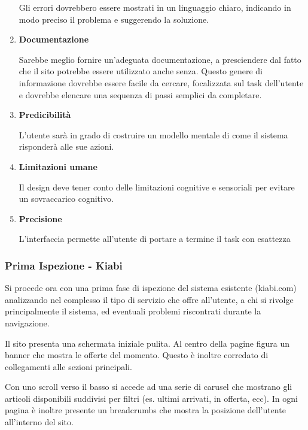 \documentclass[12pt,italian,]{report}
\begin{document}
\begin{enumerate}
  Gli errori dovrebbero essere mostrati in un linguaggio chiaro,
  indicando in modo preciso il problema e suggerendo la soluzione.
\item
  \textbf{Documentazione}


Sarebbe meglio fornire un'adeguata documentazione, a presciendere dal
fatto che il sito potrebbe essere utilizzato anche senza. Questo genere
di informazione dovrebbe essere facile da cercare, focalizzata sul task
dell'utente e dovrebbe elencare una sequenza di passi semplici da
completare.

\def\labelenumi{\arabic{enumi}.}
\setcounter{enumi}{10}
\item
    \textbf{Predicibilità}

L'utente sarà in grado di costruire un modello mentale di come il
sistema risponderà alle sue azioni.

\def\labelenumi{\arabic{enumi}.}
\setcounter{enumi}{11}
\item
  \textbf{Limitazioni umane}

Il design deve tener conto delle limitazioni cognitive e sensoriali per
evitare un sovraccarico cognitivo.

\def\labelenumi{\arabic{enumi}.}
\setcounter{enumi}{12}
\item
  \textbf{Precisione}

L'interfaccia permette all'utente di portare a termine il task con
esattezza
\end{enumerate}


\subsubsection{Prima Ispezione - Kiabi}\label{prima-ispezione}
Si procede ora con una prima fase di ispezione del sistema esistente (kiabi.com) analizzando nel complesso il tipo di servizio che offre all’utente, a chi si rivolge principalmente il sistema, ed eventuali problemi riscontrati durante la navigazione.

Il sito presenta una schermata iniziale pulita. Al centro della pagine figura un banner che mostra le offerte del momento. Questo è inoltre corredato di collegamenti alle sezioni principali. 

Con uno scroll verso il basso si accede ad una serie di carusel che mostrano gli articoli disponibili suddivisi per filtri (es. ultimi arrivati, in offerta, ecc).
In ogni pagina è inoltre presente un breadcrumbs che mostra la posizione dell'utente all'interno del sito.
\end{document}
